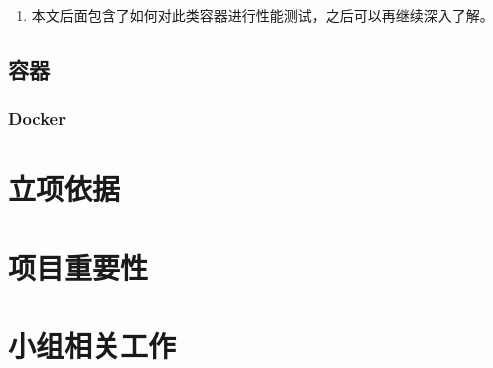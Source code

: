 \documentclass[AutoFakeBold,a4paper]{ctexart}
\begin{document}
\begin{enumerate}
    \item 本文后面包含了如何对此类容器进行性能测试，之后可以再继续深入了解。
\end{enumerate}

\subsection{容器}

\subsubsection{Docker}


\section{立项依据}

\section{项目重要性}

\section{小组相关工作}



\end{document}
